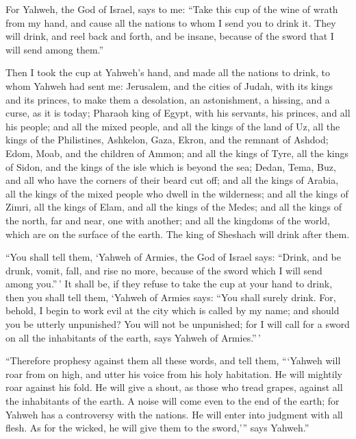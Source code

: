  For Yahweh, the God of Israel, says to me: ``Take this
cup of the wine of wrath from my hand, and cause all the nations to whom
I send you to drink it.  They will drink, and reel back
and forth, and be insane, because of the sword that I will send among
them.''

 Then I took the cup at Yahweh's hand, and made all the
nations to drink, to whom Yahweh had sent me:  Jerusalem,
and the cities of Judah, with its kings and its princes, to make them a
desolation, an astonishment, a hissing, and a curse, as it is today;
 Pharaoh king of Egypt, with his servants, his princes,
and all his people;  and all the mixed people, and all
the kings of the land of Uz, all the kings of the Philistines, Ashkelon,
Gaza, Ekron, and the remnant of Ashdod;  Edom, Moab, and
the children of Ammon;  and all the kings of Tyre, all
the kings of Sidon, and the kings of the isle which is beyond the sea;
 Dedan, Tema, Buz, and all who have the corners of their
beard cut off;  and all the kings of Arabia, all the
kings of the mixed people who dwell in the wilderness; 
and all the kings of Zimri, all the kings of Elam, and all the kings of
the Medes;  and all the kings of the north, far and near,
one with another; and all the kingdoms of the world, which are on the
surface of the earth. The king of Sheshach will drink after them.

 ``You shall tell them, `Yahweh of Armies, the God of
Israel says: ``Drink, and be drunk, vomit, fall, and rise no more,
because of the sword which I will send among you.''\,' 
It shall be, if they refuse to take the cup at your hand to drink, then
you shall tell them, `Yahweh of Armies says: ``You shall surely drink.
 For, behold, I begin to work evil at the city which is
called by my name; and should you be utterly unpunished? You will not be
unpunished; for I will call for a sword on all the inhabitants of the
earth, says Yahweh of Armies.''\,'

 ``Therefore prophesy against them all these words, and
tell them, ```Yahweh will roar from on high, and utter his voice from
his holy habitation. He will mightily roar against his fold. He will
give a shout, as those who tread grapes, against all the inhabitants of
the earth.  A noise will come even to the end of the
earth; for Yahweh has a controversy with the nations. He will enter into
judgment with all flesh. As for the wicked, he will give them to the
sword,''' says Yahweh.''

